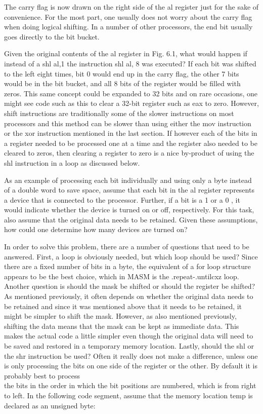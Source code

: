\documentclass[10pt]{book}
\begin{document}
The carry flag is now drawn on the right side of the al register just for the sake of convenience. For the most part, one usually does not worry about the carry flag when doing logical shifting. In a number of other processors, the end bit usually goes directly to the bit bucket.

Given the original contents of the al register in Fig. 6.1, what would happen if instead of a shl al,1 the instruction shl al, 8 was executed? If each bit was shifted to the left eight times, bit 0 would end up in the carry flag, the other 7 bits would be in the bit bucket, and all 8 bits of the register would be filled with zeros. This same concept could be expanded to 32 bits and on rare occasions, one might see code such as this to clear a 32-bit register such as eax to zero. However, shift instructions are traditionally some of the slower instructions on most processors and this method can be slower than using either the mov instruction or the xor instruction mentioned in the last section. If however each of the bits in a register needed to be processed one at a time and the register also needed to be cleared to zeros, then clearing a register to zero is a nice by-product of using the shl instruction in a loop as discussed below.

As an example of processing each bit individually and using only a byte instead of a double word to save space, assume that each bit in the al register represents a device that is connected to the processor. Further, if a bit is a 1 or a 0 , it would indicate whether the device is turned on or off, respectively. For this task, also assume that the original data needs to be retained. Given these assumptions, how could one determine how many devices are turned on?

In order to solve this problem, there are a number of questions that need to be answered. First, a loop is obviously needed, but which loop should be used? Since there are a fixed number of bits in a byte, the equivalent of a for loop structure appears to be the best choice, which in MASM is the .repeat-.untilcxz loop. Another question is should the mask be shifted or should the register be shifted? As mentioned previously, it often depends on whether the original data needs to be retained and since it was mentioned above that it needs to be retained, it might be simpler to shift the mask. However, as also mentioned previously, shifting the data means that the mask can be kept as immediate data. This makes the actual code a little simpler even though the original data will need to be saved and restored in a temporary memory location. Lastly, should the shl or the shr instruction be used? Often it really does not make a difference, unless one is only processing the bits on one side of the register or the other. By default it is probably best to process\\
the bits in the order in which the bit positions are numbered, which is from right to left. In the following code segment, assume that the memory location temp is declared as an unsigned byte:
\end{document}
